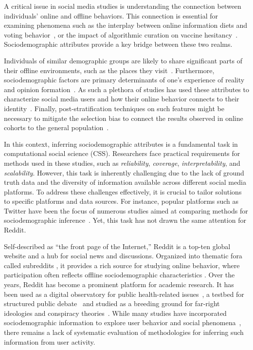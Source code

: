 
A critical issue in social media studies is understanding the connection between individuals’ online and offline behaviors.
This connection is essential for examining phenomena such as the interplay between online information diets and voting behavior~\citep{bach2021predicting}, or the impact of algorithmic curation on vaccine hesitancy~\citep{sasse2024understanding}.
Sociodemographic attributes provide a key bridge between these two realms.

Individuals of similar demographic groups are likely to share significant parts of their offline environments, such as the places they visit~\citep{fan2023diversity}.
Furthermore, sociodemographic factors are primary determinants of one's experience of reality~\citep{lee2014newsworthy} and opinion formation~\citep{hamilton2011all, capozzi2021clandestino}.
As such a plethora of studies has used these attributes to characterize social media users and how their online behavior connects to their identity~\citep{rivas2020classification,gjurkovic2021pandora,tadesse2019detection}.
Finally, post-stratification techniques on such features might be necessary to mitigate the selection bias to connect the results observed in online cohorts to the general population~\citep{giorgi2022correcting}.

In this context, inferring sociodemographic attributes is a fundamental task in computational social science (CSS). 
Researchers face practical requirements for methods used in these studies, such as \emph{reliability}, \emph{coverage}, \emph{interpretability}, and \emph{scalability}. 
However, this task is inherently challenging due to the lack of ground truth data and the diversity of information available across different social media platforms.
To address these challenges effectively, it is crucial to tailor solutions to specific platforms and data sources.
For instance, popular platforms such as Twitter have been the focus of numerous studies aimed at comparing methods for sociodemographic inference~\citep{chen2015comparative, sadah2016demographic}.
Yet, this task has not drawn the same attention for Reddit.

Self-described as “the front page of the Internet,” Reddit is a top-ten global website and a hub for social news and discussions. 
Organized into thematic fora called subreddits \citep{baumgartner2020pushshift}, it provides a rich source for studying online behavior, where participation often reflects offline sociodemographic characteristics \citep{medvedev2019anatomy}.
Over the years, Reddit has become a prominent platform for academic research.
It has been used as a digital observatory for public health-related issues~\citep{balsamo2019firsthand, lokala2022computational, balsamo2023pursuit}, a testbed for structured public debate~\citep{cinelli2021echo,monti2022language,colacrai2024navigating} and studied as a breeding ground for far-right ideologies and conspiracy theories~\citep{klein2019pathways,rollo2022communities}.
While many studies have incorporated sociodemographic information to explore user behavior and social phenomena~\citep{monti2023evidence}, there remains a lack of systematic evaluation of methodologies for inferring such information from user activity.

